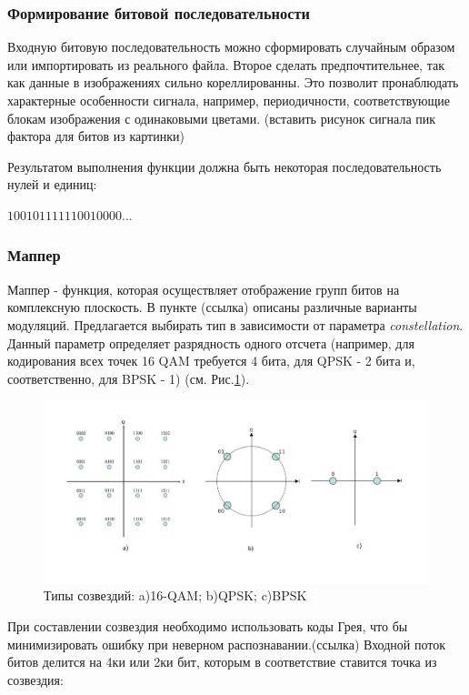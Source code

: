 \subsubsection*{Формирование битовой последовательности}

Входную битовую последовательность можно сформировать случайным образом или импортировать из реального файла.
Второе сделать предпочтительнее, так как данные в изображениях сильно кореллированны. Это позволит пронаблюдать характерные особенности сигнала, например, периодичности,  соответствующие блокам изображения с одинаковыми цветами.  (вставить рисунок сигнала пик фактора для битов из картинки)

Результатом выполнения функции должна быть некоторая последовательность нулей и единиц:

$ 100101111110010000 ...$

\subsubsection*{Маппер}
Маппер - функция, которая осуществляет отображение групп битов на комплексную плоскость. 
В пункте (ссылка)
описаны различные варианты модуляций. 
Предлагается выбирать тип в зависимости от параметра \textit{constellation}.
Данный параметр определяет разрядность одного отсчета (например, для кодирования всех точек 16 QAM требуется 4 бита, для QPSK  - 2 бита и, соответственно, для BPSK - 1) (см. Рис.\ref{fg:constellations}).

\begin{figure}[h!]
\centering
\includegraphics[width=1\textwidth]{constellations}
\caption{Типы созвездий: a)16-QAM;  b)QPSK;  c)BPSK} \label{fg:constellations}
\end{figure}

При составлении созвездия необходимо использовать коды Грея, что бы минимизировать ошибку при неверном распознавании.(ссылка)
Входной поток битов делится на 4ки или 2ки бит, которым в соответствие ставится точка из созвездия:

